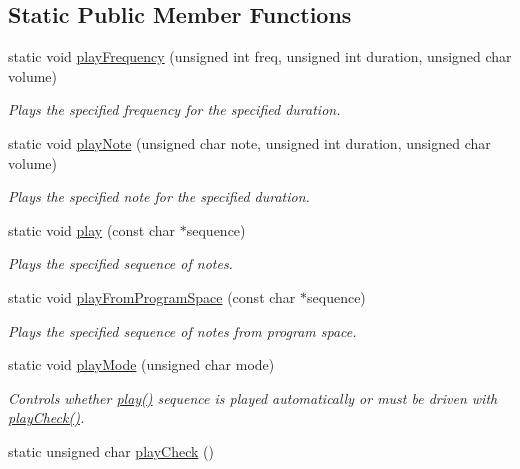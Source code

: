 \subsection*{Static Public Member Functions}
\begin{DoxyCompactItemize}
\item 
static void \hyperlink{class_pololu_buzzer_a931fafd76045ae59d4ba62c9bf90b0dc}{play\+Frequency} (unsigned int freq, unsigned int duration, unsigned char volume)
\begin{DoxyCompactList}\small\item\em Plays the specified frequency for the specified duration. \end{DoxyCompactList}\item 
static void \hyperlink{class_pololu_buzzer_a989d410dd6cdb7abfa136c3734040fb5}{play\+Note} (unsigned char note, unsigned int duration, unsigned char volume)
\begin{DoxyCompactList}\small\item\em Plays the specified note for the specified duration. \end{DoxyCompactList}\item 
static void \hyperlink{class_pololu_buzzer_a22f45ef7cdf9dc8fc54e617244368277}{play} (const char $\ast$sequence)
\begin{DoxyCompactList}\small\item\em Plays the specified sequence of notes. \end{DoxyCompactList}\item 
static void \hyperlink{class_pololu_buzzer_a07ff4e9d9f7e4f37a58e149640b61f4e}{play\+From\+Program\+Space} (const char $\ast$sequence)
\begin{DoxyCompactList}\small\item\em Plays the specified sequence of notes from program space. \end{DoxyCompactList}\item 
static void \hyperlink{class_pololu_buzzer_ab72bde97ceceef8705f1bbaeccb970db}{play\+Mode} (unsigned char mode)
\begin{DoxyCompactList}\small\item\em Controls whether {\ttfamily \hyperlink{class_pololu_buzzer_a22f45ef7cdf9dc8fc54e617244368277}{play()}} sequence is played automatically or must be driven with {\ttfamily \hyperlink{class_pololu_buzzer_a427225dcc85c1e65078e4397b9890929}{play\+Check()}}. \end{DoxyCompactList}\item 
static unsigned char \hyperlink{class_pololu_buzzer_a427225dcc85c1e65078e4397b9890929}{play\+Check} ()

\end{DoxyCompactItemize}

